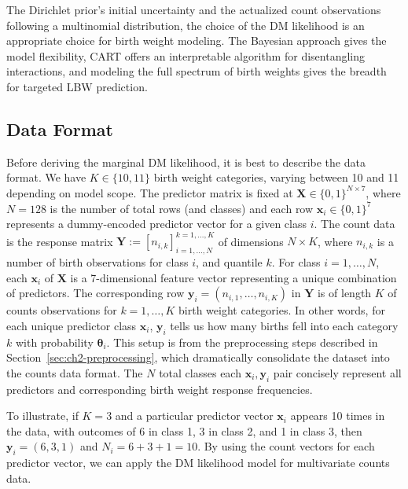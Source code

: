 The Dirichlet prior's initial uncertainty and the actualized count observations following a multinomial distribution, the choice of the DM likelihood is an appropriate choice for birth weight modeling. The Bayesian approach gives the model flexibility, CART offers an interpretable algorithm for disentangling interactions, and modeling the full spectrum of birth weights gives the breadth for targeted LBW prediction. 

\subsection{Data Format}
\label{sec:ch2-data-format}

Before deriving the marginal DM likelihood, it is best to describe the data format. We have \(K\in\{10,11\}\) birth weight categories, varying between 10 and 11 depending on model scope. The predictor matrix is fixed at \(\mathbf{X} \in \{0,1\}^{N \times 7}\), where \(N=128\) is the number of total rows (and classes) and each row \(\mathbf{x}_i \in \{0,1\}^7\) represents a dummy-encoded predictor vector for a given class \(i\). The count data is the response matrix \(\mathbf{Y} := [n_{i,k}]_{i=1,\dots,N}^{k = 1,\dots,K}\) of dimensions \(N \times K\), where \(n_{i,k}\) is a number of birth observations for class \(i\), and quantile \(k\). For class \(i=1,\dots,N\), each \(\mathbf{x}_i\) of \(\mathbf{X}\) is a 7-dimensional feature vector representing a unique combination of predictors. The corresponding row \(\mathbf{y}_i =(n_{i,1}, \dots, n_{i,K}) \) in \(\mathbf{Y}\) is of length \(K\) of counts observations for \(k = 1, \dots, K\) birth weight categories. In other words, for each unique predictor class \(\mathbf{x}_i\), \(\mathbf{y}_i\) tells us how many births fell into each category \(k\) with probability \(\boldsymbol{\theta}_i\). This setup is from the preprocessing steps described in Section~\ref{sec:ch2-preprocessing}, which dramatically consolidate the dataset into the counts data format. The \(N\) total classes each \(\mathbf{x}_i, \mathbf{y}_i\) pair concisely represent all predictors and corresponding birth weight response frequencies. 

To illustrate, if \(K=3\) and a particular predictor vector \(\mathbf{x}_i\) appears 10 times in the data, with outcomes of 6 in class 1, 3 in class 2, and 1 in class 3, then \(\mathbf{y}_i = (6,3,1)\) and \(N_i = 6 + 3 + 1 = 10\). By using the count vectors for each predictor vector, we can apply the DM likelihood model for multivariate counts data.

